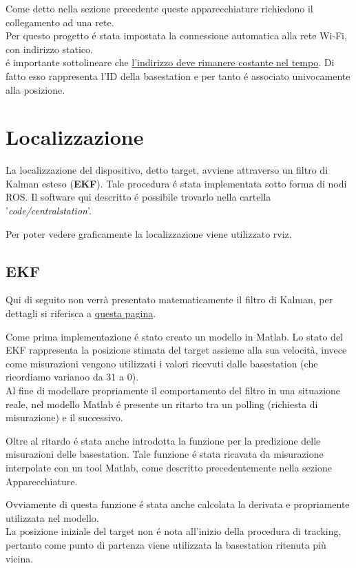 \documentclass{article}
\begin{document}
Come detto nella sezione precedente queste apparecchiature richiedono il collegamento ad una rete.\\
Per questo progetto \'e stata impostata la connessione automatica alla rete Wi-Fi, con indirizzo statico.\\
\'e importante sottolineare che \underline{l'indirizzo deve rimanere costante nel tempo}. Di fatto esso rappresenta l'ID della basestation e per tanto \'e associato univocamente alla posizione.


\section{Localizzazione}
La localizzazione del dispositivo, detto target, avviene attraverso un filtro di Kalman esteso (\textbf{EKF}).
Tale procedura \'e stata implementata sotto forma di nodi ROS.
Il software qui descritto \'e possibile trovarlo nella cartella '\textit{code/centralstation}'.

Per poter vedere graficamente la localizzazione viene utilizzato rviz.


\subsection{EKF}
Qui di seguito non verr\`a presentato matematicamente il filtro di Kalman, per dettagli si riferisca a \href{https://en.wikipedia.org/wiki/Extended_Kalman_filter}{ \underline{questa pagina}}.

Come prima implementazione \'e stato creato un modello in Matlab.
Lo stato del EKF rappresenta la posizione stimata del target assieme alla sua velocit\`a, invece come misurazioni vengono utilizzati i valori ricevuti dalle basestation (che ricordiamo varianoo da 31 a 0).\\
Al fine di modellare propriamente il comportamento del filtro in una situazione reale, nel modello Matlab \'e presente un ritarto tra un polling (richiesta di misurazione) e il successivo.


Oltre al ritardo  \'e stata anche introdotta la funzione per la predizione delle misurazioni delle basestation. Tale funzione \'e stata ricavata da misurazione interpolate con un tool Matlab, come descritto precedentemente nella sezione Apparecchiature.



Ovviamente di questa funzione \'e stata anche calcolata la derivata e propriamente utilizzata nel modello.\\
La posizione iniziale del target non \'e nota all'inizio della procedura di tracking, pertanto come punto di partenza viene utilizzata la basestation ritenuta pi\`u vicina.
\end{document}
